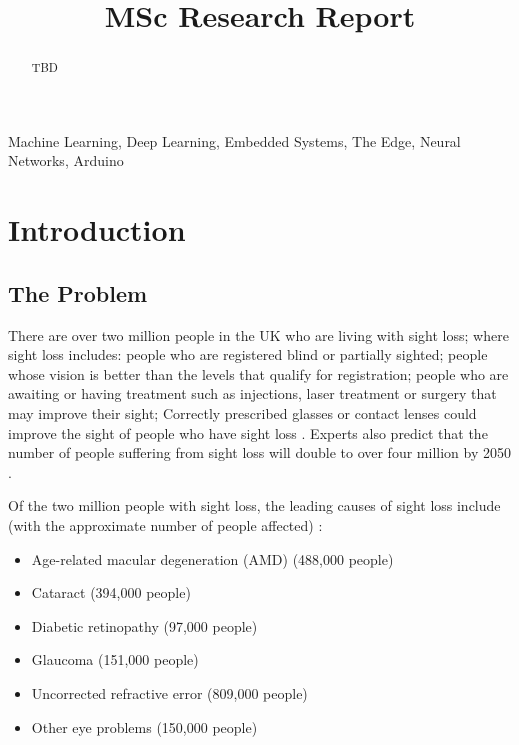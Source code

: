 \documentclass[conference]{IEEEtran}
\begin{document}
\title{MSc Research Report\\}

\author{
}

\maketitle

\begin{abstract}
TBD
\end{abstract}

\begin{IEEEkeywords}
Machine Learning, Deep Learning, Embedded Systems, The Edge, Neural Networks, Arduino
\end{IEEEkeywords}

\section{Introduction}
\subsection{The Problem}
There are over two million people in the UK who are living with sight loss; where sight loss includes: people who are registered blind or partially sighted; people whose vision is better than the levels that qualify for registration; people who are awaiting or having treatment such as injections, laser treatment or surgery that may improve their sight; Correctly prescribed glasses or contact lenses could improve the sight of people who have sight loss \cite{rnib}. Experts also predict that the number of people suffering from sight loss will double to over four million by 2050 \cite{Pezzullo}.

Of the two million people with sight loss, the leading causes of sight loss include (with the approximate number of people affected) \cite{rnib}:
\begin{itemize}
    \item Age-related macular degeneration (AMD) (488,000 people)
    \item Cataract (394,000 people)
    \item Diabetic retinopathy (97,000 people)
    \item Glaucoma (151,000 people)
    \item Uncorrected refractive error (809,000 people)
    \item Other eye problems (150,000 people)
\end{itemize}
\end{document}
